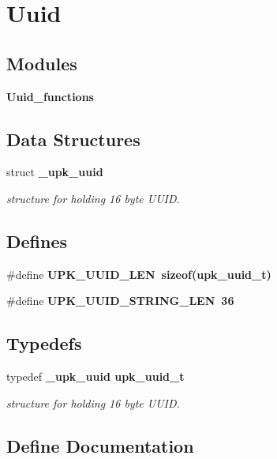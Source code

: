 \section{Uuid}
\label{group__uuid}
\subsection*{Modules}
\begin{CompactItemize}
\item 
\bf{Uuid\_\-functions}
\end{CompactItemize}
\subsection*{Data Structures}
\begin{CompactItemize}
\item 
struct \bf{\_\-upk\_\-uuid}
\begin{CompactList}\small\item\em structure for holding 16 byte UUID. \item\end{CompactList}\end{CompactItemize}
\subsection*{Defines}
\begin{CompactItemize}
\item 
\#define \bf{UPK\_\-UUID\_\-LEN}~sizeof(\bf{upk\_\-uuid\_\-t})
\item 
\#define \bf{UPK\_\-UUID\_\-STRING\_\-LEN}~36
\end{CompactItemize}
\subsection*{Typedefs}
\begin{CompactItemize}
\item 
typedef \bf{\_\-upk\_\-uuid} \bf{upk\_\-uuid\_\-t}
\begin{CompactList}\small\item\em structure for holding 16 byte UUID. \item\end{CompactList}\end{CompactItemize}


\subsection{Define Documentation}
